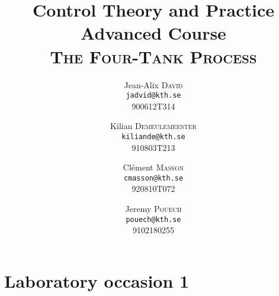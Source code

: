 \documentclass[a4paper,8pt,twocolumn]{extarticle}
\title{Control Theory and Practice \\ Advanced Course \\ \textsc{The Four-Tank Process}}
\author{Jean-Alix \textsc{David} \\ \texttt{jadvid@kth.se} \\ 900612T314 
    \and
        Kilian \textsc{Demeulemeester} \\ \texttt{kiliande@kth.se} \\ 910803T213 
    \and 
        Clément \textsc{Masson} \\ \texttt{cmasson@kth.se} \\ 920810T072
    \and
Jeremy \textsc{Pouech} \\ \texttt{pouech@kth.se} \\ 9102180255
}
\begin{document}
\setlength\parindent{0em}

\maketitle




\section{Laboratory occasion 1}




 
% 
% 
% 
% 
% 
% 
% 
% 
% 
\end{document}
